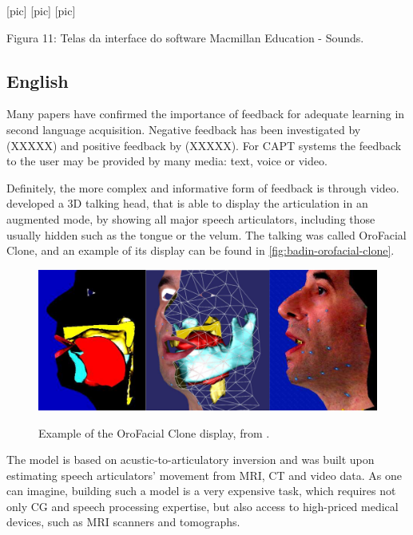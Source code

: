                          [pic]  [pic]  [pic]

Figura 11: Telas da interface do software Macmillan Education - Sounds.

\subsection{English}

Many papers have confirmed the importance of feedback for adequate learning in second language
acquisition. Negative feedback has been investigated by (XXXXX) and positive feedback by (XXXXX).
For \ac{CAPT} systems the feedback to the user may be provided by many media: text, voice or video.

Definitely, the more complex and informative form of feedback is through video. \citet{Badin2010} \citep{Badin2010}
developed a 3D talking head, that is able to display the articulation in an augmented mode,
by showing all major speech articulators, including those usually hidden such as the tongue or the velum. The talking
was called OroFacial Clone, and an example of its display can be found in \autoref{fig:badin-orofacial-clone}.

\begin{figure}[!htb]
        \myfloatalign
        {\includegraphics[width=.66\linewidth]{gfx/badin-orofacial-clone.png}}
        \caption{Example of the OroFacial Clone display, from \citet{Badin2010} \citep{Badin2010}.}
        \label{fig:badin-orofacial-clone}
\end{figure}

The model is based on acustic-to-articulatory inversion and was built upon estimating speech articulators' 
movement from \ac{MRI}, \ac{CT} and video data. As one can imagine, building such a model is a very expensive task, which 
requires not only \ac{CG} and speech processing expertise, but also access to high-priced medical devices, such as 
\ac{MRI} scanners and tomographs. 

